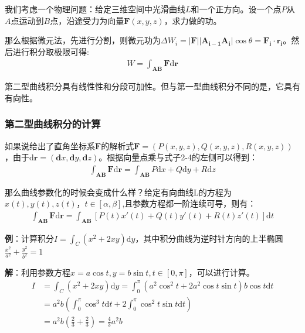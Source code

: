 \documentclass{ctexart}
\let\oldtextbf\textbf
\renewcommand{\textbf}[1]{\textcolor{brown!50!red}{\oldtextbf{#1}}}
\begin{document}
我们考虑一个物理问题：给定三维空间中光滑曲线$L$和一个正方向。设一个点$P$从$A$点运动到$B$点，沿途受力为向量$\bm{F}(x,y,z)$，求力做的功。

那么根据微元法，先进行分割，则微元功为$\Delta W_i=|\bm{F}||\bm{A_{i-1}A_i}|\cos\theta=\bm{F_i}\cdot \bm{r_i}$。然后进行积分取极限可得:
\begin{align*}
W=\int_{\bm{AB}}\bm{F}\mathrm{d}\bm{r}\tag{2-4}
\end{align*}

第二型曲线积分具有线性性和分段可加性。但与第一型曲线积分不同的是，它具有有向性。

\subsubsection{第二型曲线积分的计算}
\begin{tcolorbox}[
    colback=bac1,     %
    colframe=fra1,   %
    coltitle=white,             %
    coltext=tex1,
    title= 第二型曲线积分的计算,
    fonttitle=\bfseries,        %
arc=3mm,                     %
breakable
]
如果说给出了直角坐标系$\bm{F}$的解析式$\bm{F}=(P(x,y,z),Q(x,y,z),R(x,y,z))$，由于$\mathrm{d}\bm{r}=(\bm{d}x,\bm{d}y,\bm{d}z)$。根据向量点乘与式子2-4的左侧可以得到：
\begin{align*} 
\int_{\bm{AB}}\bm{F}\mathrm{d}\bm{r}=
\int_{\bm{AB}}P\mathrm{d}x+Q\mathrm{d}y+R\mathrm{d}z\tag{2-5}  
\end{align*}

那么曲线参数化的时候会变成什么样？给定有向曲线L的方程为$x(t),y(t),z(t)，t\in[\alpha,\beta]$,且参数方程都一阶连续可导，则有：
\begin{align*}  \int_{\bm{AB}}\bm{F}\mathrm{d}\bm{r}=
\int_{\bm{AB}}\left[P(t)x'(t)+Q(t)y'(t)+R(t)z'(t)\right]\mathrm{d}t\tag{2-6} 
\end{align*}
\end{tcolorbox}

\textbf{\color{brown!50!red}例}：计算积分$I=\int_C (x^2+2xy)\mathrm{d}y$，其中积分曲线为逆时针方向的上半椭圆$\frac{x^2}{a^2}+\frac{y^2}{b^2}=1$

\textbf{\color{brown!50!red}解}：利用参数方程$x=a\cos t,y=b \sin t,t\in[0,\pi]$，可以进行计算。
\begin{align*}
   I&=\int_C (x^2+2xy)\mathrm{d}y=\int_0^\pi(a^2\cos^2t+2a^2\cos t\sin t)b\cos t\mathrm{d}t \\
&=a^2b\left ( \int_0^\pi\cos^3 t\mathrm{d}t+2\int_0^\pi\cos^2 t\sin t\mathrm
d t \right )\\
&=a^2b(\frac{2}{3}+ \frac{2}{3})=\frac{4}{3}a^2b 
\end{align*}
\end{document}
